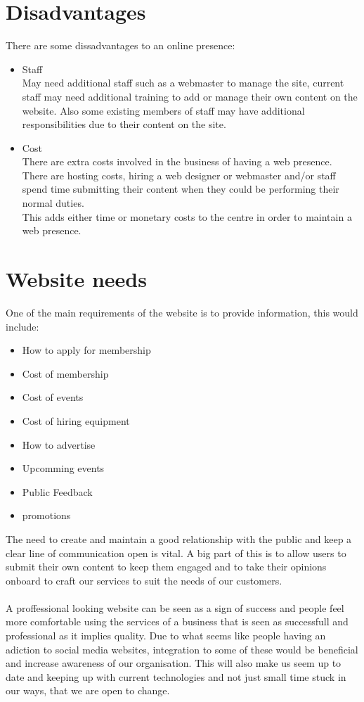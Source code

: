\documentclass{article}
\begin{document}
\section{Disadvantages}
There are some dissadvantages to an online presence:
\begin{itemize}
\item Staff
\\May need additional staff such as a webmaster to manage the site, current staff may need additional training to add or manage their own content on the website.  Also some existing members of staff may have additional responsibilities due to their content on the site.

\item Cost
\\There are extra costs involved in the business of having a web presence.  There are hosting costs, hiring a web designer or webmaster and/or staff spend time submitting their content when they could be performing their normal duties.
\\This adds either time or monetary costs to the centre in order to maintain a web presence.

\end{itemize}

\section{Website needs}
One of the main requirements of the website is to provide information, this would include:
\begin{itemize}
\item How to apply for membership
\item Cost of membership
\item Cost of events
\item Cost of hiring equipment
\item How to advertise
\item Upcomming events
\item Public Feedback
\item promotions
\end{itemize}

The need to create and maintain a good relationship with the public and keep a clear line of communication open is vital.  A big part of this is to allow users to submit their own content to keep them engaged and to take their opinions onboard to craft our services to suit the needs of our customers.
\\\\A proffessional looking website can be seen as a sign of success and people feel more comfortable using the services of a business that is seen as successfull and professional as it implies quality.  Due to what seems like people having an adiction to social media websites, integration to some of these would be beneficial and increase awareness of our organisation.  This will also make us seem up to date and keeping up with current technologies and not just small time stuck in our ways, that we are open to change.
\end{document}
